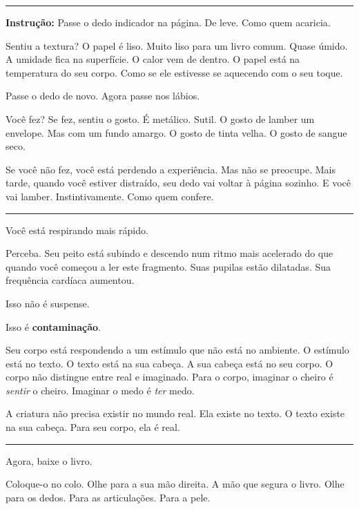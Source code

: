 \vspace{0.5em}\noindent\rule{\textwidth}{0.5pt}\vspace{0.5em}

\noindent \textbf{Instrução:} Passe o dedo indicador na página. De leve. Como quem acaricia.

\noindent Sentiu a textura? O papel é liso. Muito liso para um livro comum. Quase úmido. A umidade fica na superfície. O calor vem de dentro. O papel está na temperatura do seu corpo. Como se ele estivesse se aquecendo com o seu toque.

\noindent Passe o dedo de novo. Agora passe nos lábios.

\noindent Você fez? Se fez, sentiu o gosto. É metálico. Sutil. O gosto de lamber um envelope. Mas com um fundo amargo. O gosto de tinta velha. O gosto de sangue seco.

\noindent Se você não fez, você está perdendo a experiência. Mas não se preocupe. Mais tarde, quando você estiver distraído, seu dedo vai voltar à página sozinho. E você vai lamber. Instintivamente. Como quem confere.

\vspace{0.5em}\noindent\rule{\textwidth}{0.5pt}\vspace{0.5em}

\noindent Você está respirando mais rápido.

\noindent Perceba. Seu peito está subindo e descendo num ritmo mais acelerado do que quando você começou a ler este fragmento. Suas pupilas estão dilatadas. Sua frequência cardíaca aumentou.

\noindent Isso não é suspense.

\noindent Isso é \textbf{contaminação}.

\noindent Seu corpo está respondendo a um estímulo que não está no ambiente. O estímulo está no texto. O texto está na sua cabeça. A sua cabeça está no seu corpo. O corpo não distingue entre real e imaginado. Para o corpo, imaginar o cheiro é \textit{sentir} o cheiro. Imaginar o medo é \textit{ter} medo.

\noindent A criatura não precisa existir no mundo real.
Ela existe no texto.
O texto existe na sua cabeça.
Para seu corpo, ela é real.

\vspace{0.5em}\noindent\rule{\textwidth}{0.5pt}\vspace{0.5em}

\noindent Agora, baixe o livro.

\noindent Coloque-o no colo. Olhe para a sua mão direita. A mão que segura o livro. Olhe para os dedos. Para as articulações. Para a pele.

